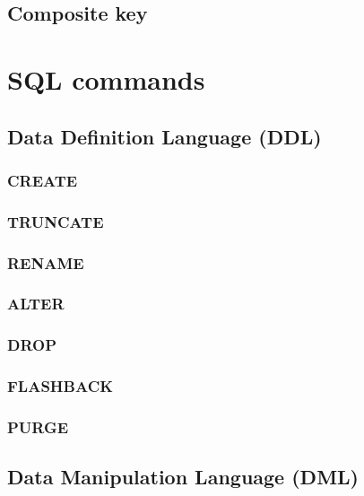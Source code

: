 \documentclass[14pt,fleqn]{extbook} %
\begin{document}
\section{Composite key}


\chapter{SQL commands}

\section{Data Definition Language (DDL)}

\subsection{CREATE}

\subsection{TRUNCATE}

\subsection{RENAME}

\subsection{ALTER}

\subsection{DROP}

\subsection{FLASHBACK}

\subsection{PURGE}

%
\section{Data Manipulation Language (DML)}

\end{document}
